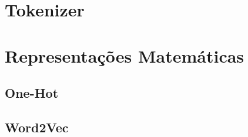 \section{Tokenizer}

\section{Representações Matemáticas}

\subsection{One-Hot}

\subsection{Word2Vec}
